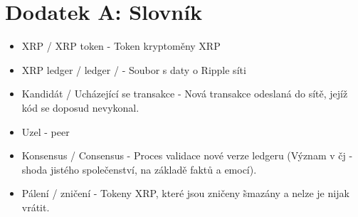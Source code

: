 \documentclass[hidelinks, titlepage]{article}
\begin{document}
\section{Dodatek A: Slovník}
\begin{itemize}
\item XRP / XRP token - Token kryptoměny XRP
\item XRP ledger / ledger /  - Soubor s daty o Ripple síti
\item Kandidát / Ucházející se transakce - Nová transakce odeslaná do sítě, jejíž kód se doposud nevykonal.
\item Uzel - peer
\item Konsensus / Consensus - Proces validace nové verze ledgeru (Význam v čj - shoda jistého společenství, na základě faktů a emocí).
\item Pálení / zničení - Tokeny XRP, které jsou zničeny \~ smazány a nelze je nijak vrátit.
\end{itemize}
\end{document}
